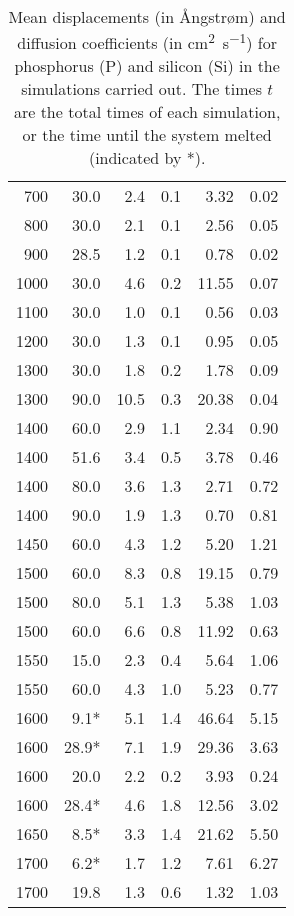 \documentclass[11pt,bibliography=totoc,index=totoc]{scrbook}   %
\begin{document}
\begin{table}[htbp]
\begin{tabular}{rrrrrr}
         700 & 30.0  &  2.4 &  0.1 &  3.32 &  0.02 \\
         800 & 30.0  &  2.1 &  0.1 &  2.56 &  0.05 \\
         900 & 28.5  &  1.2 &  0.1 &  0.78 &  0.02 \\
        1000 & 30.0  &  4.6 &  0.2 & 11.55 &  0.07 \\
        1100 & 30.0  &  1.0 &  0.1 &  0.56 &  0.03 \\
        1200 & 30.0  &  1.3 &  0.1 &  0.95 &  0.05 \\
        1300 & 30.0  &  1.8 &  0.2 &  1.78 &  0.09 \\
        1300 & 90.0  & 10.5 &  0.3 & 20.38 &  0.04 \\
        1400 & 60.0  &  2.9 &  1.1 &  2.34 &  0.90 \\
        1400 & 51.6  &  3.4 &  0.5 &  3.78 &  0.46 \\
        1400 & 80.0  &  3.6 &  1.3 &  2.71 &  0.72 \\
        1400 & 90.0  &  1.9 &  1.3 &  0.70 &  0.81 \\
        1450 & 60.0  &  4.3 &  1.2 &  5.20 &  1.21 \\
        1500 & 60.0  &  8.3 &  0.8 & 19.15 &  0.79 \\
        1500 & 80.0  &  5.1 &  1.3 &  5.38 &  1.03 \\
        1500 & 60.0  &  6.6 &  0.8 & 11.92 &  0.63 \\
        1550 & 15.0  &  2.3 &  0.4 &  5.64 &  1.06 \\
        1550 & 60.0  &  4.3 &  1.0 &  5.23 &  0.77 \\
        1600 &  9.1* &  5.1 &  1.4 & 46.64 &  5.15 \\
        1600 & 28.9* &  7.1 &  1.9 & 29.36 &  3.63 \\
        1600 & 20.0  &  2.2 &  0.2 &  3.93 &  0.24 \\
        1600 & 28.4* &  4.6 &  1.8 & 12.56 &  3.02 \\
        1650 &  8.5* &  3.3 &  1.4 & 21.62 &  5.50 \\
        1700 &  6.2* &  1.7 &  1.2 &  7.61 &  6.27 \\
        1700 & 19.8  &  1.3 &  0.6 &  1.32 &  1.03 \\
    \bottomrule
  \end{tabular}
  \caption{Mean displacements (in Ångstrøm) and diffusion coefficients (in \si{\centi\metre\squared\per\second}) 
    for phosphorus (P) and silicon (Si) in the simulations carried out. 
    The times $t$ are the total times of each simulation, or the time until the system melted (indicated by *).
    }
  \label{tab:displacements}
\end{table}
\end{document}
